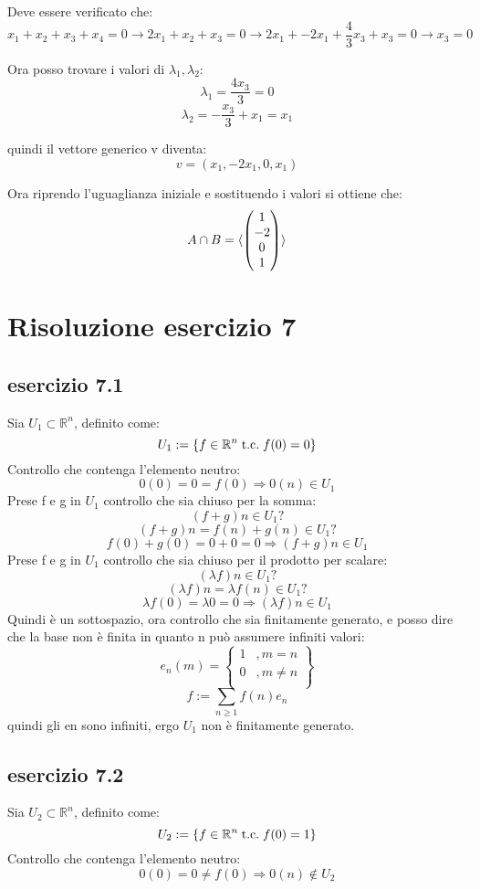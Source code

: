 \documentclass[a4paper,12pt]{article}
\begin{document}
	Deve essere verificato che:
	\[x_1 + x_2 + x_3 + x_4 = 0 \rightarrow 2x_1 + x_2 + x_3 = 0 \rightarrow 2x_1 + -2x_1 + \frac{4}{3}x_3 + x_3 = 0 \rightarrow x_3 = 0 \]
	
	Ora posso trovare i valori di $\lambda_1, \lambda_2$:
	\[\lambda_1 = \frac{4x_3}{3} = 0\]
	\[\lambda_2 = - \frac{x_3}{3} + x_1 = x_1\]
	
	quindi il vettore generico v diventa:
	\[v = (x_1, -2x_1, 0, x_1)\]
	
	Ora riprendo l'uguaglianza iniziale e sostituendo i valori si ottiene che:
	\[A \cap B = \langle \begin{pmatrix} 1 \\ -2 \\ 0 \\ 1 \end{pmatrix} \rangle\]	
	
	\section{Risoluzione esercizio 7}
	\subsection{esercizio 7.1}
	Sia $U_1 \subset \mathbb{R}^n$, definito come:
	\[U_1 :=\{f \in \mathbb{R}^n \;\text{t.c.}\; f(0) = 0\}\]
	Controllo che contenga l'elemento neutro:
	\[0(0) = 0 = f(0) \Rightarrow 0(n) \in U_1\]
	Prese f e g in $U_1$ controllo che sia chiuso per la somma:
	\[(f + g) n \in U_1?\]
	\[(f + g) n = f(n) + g(n) \in U_1?\]
	\[f(0) + g(0) = 0 + 0 = 0 \Rightarrow (f + g) n \in U_1\]
	Prese f e g in $U_1$ controllo che sia chiuso per il prodotto per scalare:
	\[(\lambda f) n \in U_1?\]
	\[(\lambda f) n = \lambda f(n) \in U_1?\]
	\[\lambda f(0)= \lambda 0 = 0 \Rightarrow (\lambda f) n \in U_1\]
	Quindi è un sottospazio, ora controllo che sia finitamente generato, e posso dire che la base non è finita in quanto n può assumere infiniti valori:
	\[e_n (m) = \left\{\begin{aligned}
		1&, m = n \\
		0&, m \not = n \\		
	\end{aligned}\right\}\] 
	\[f := \sum_{n \geq 1} f(n)e_n\]
	quindi gli en sono infiniti, ergo $U_1$ non è finitamente generato.
	\subsection{esercizio 7.2}
	Sia $U_2 \subset \mathbb{R}^n$, definito come:
	\[U_2 :=\{f \in \mathbb{R}^n \;\text{t.c.}\; f(0) = 1\}\]
	Controllo che contenga l'elemento neutro:
	\[0(0) = 0 \not = f(0) \Rightarrow 0(n) \not \in U_2\]
	
\end{document}
